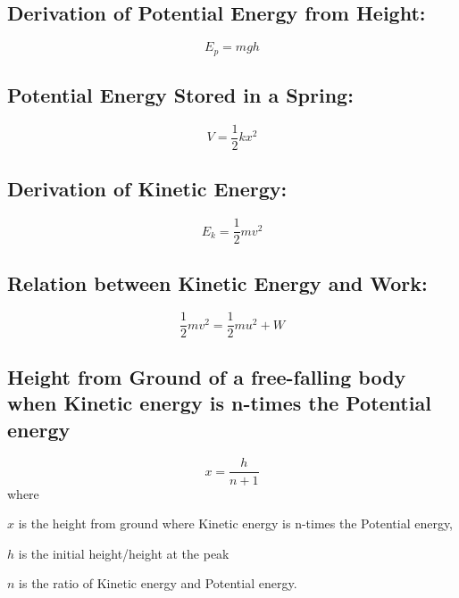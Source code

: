 \documentclass[a4paper]{report}
\begin{document}
        \subsection{Derivation of Potential Energy from Height: }
            \begin{equation}
                E_p = mgh
            \end{equation}
        \subsection{Potential Energy Stored in a Spring: }
            \begin{equation}
                V = \frac{1}{2} kx^2
            \end{equation}
        \subsection{Derivation of Kinetic Energy: }
            \begin{equation}
                E_k = \frac{1}{2}mv^2
            \end{equation}
        \subsection{Relation between Kinetic Energy and Work: }
            \begin{equation}
                \frac{1}{2} mv^2 = \frac{1}{2} mu^2 + W
            \end{equation}
        \subsection{Height from Ground of a free-falling body when Kinetic energy is n-times the Potential energy}  
            \begin{equation}
                x = \frac{h}{n + 1}
            \end{equation}
            where 
            \begin{description}
                \item $x$ is the height from ground where Kinetic energy is n-times the Potential energy,
                \item $h$ is the initial height/height at the peak
                \item $n$ is the ratio of Kinetic energy and Potential energy.
            \end{description}
\end{document}

